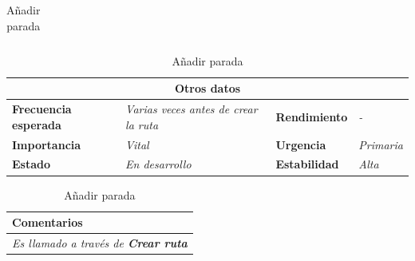 \documentclass[12pt,spanish]{article}
\begin{document}
\begin{table}[H]
\begin{tabular}{|m{5pt}|m{7.33cm}|m{5pt}|m{7.33cm}|}
		
	\end{tabular}
	
	\vspace{0.5cm}
	
	\begin{tabular}{|m{3.75cm}|m{3.75cm}|m{3.75cm}|m{3.8cm}|}
		\hline
		\multicolumn{4}{|c|}{\textbf{Otros datos}} \\
		\hline
		\textbf{Frecuencia esperada} & \textit{Varias veces antes de crear la ruta} & \textbf{Rendimiento} & \textit{-} \\
		\hline
		\textbf{Importancia} & \textit{Vital} & \textbf{Urgencia} & \textit{Primaria} \\
		\hline
		\textbf{Estado} & \textit{En desarrollo} & \textbf{Estabilidad} & \textit{Alta} \\
		\hline
	\end{tabular}
	
	\vspace{1cm}
	
	\begin{tabular}{|m{16.2cm}|}
		\hline
		\textbf{Comentarios} \\
		\hline
		\textit{Es llamado a través de \textbf{Crear ruta}} \\
		\hline
	\end{tabular}
	
	\caption{Añadir parada}
	
\end{table}
\end{document}
